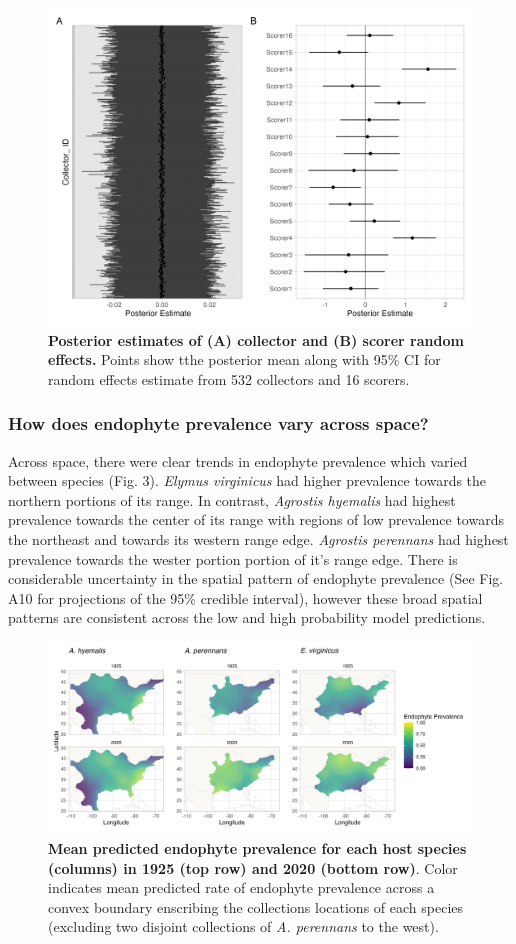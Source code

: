 \documentclass[11pt]{article}
\begin{document}
\begin{figure}[H]
	\label{fig:random_fx}
	\centering
	\includegraphics[width = .8\linewidth]{random_fx_plot.png}
	\caption{\textbf{Posterior estimates of (A) collector and (B) scorer random effects.} Points show tthe posterior mean along with 95\% CI for random effects estimate from 532 collectors and 16 scorers.}
\end{figure}


\subsubsection*{How does endophyte prevalence vary across space?}
Across space, there were clear trends in endophyte prevalence which varied between species (Fig. 3).
\emph{Elymus virginicus} had higher prevalence towards the northern portions of its range. 
In contrast, \emph{Agrostis hyemalis} had highest prevalence towards the center of its range with regions of low prevalence towards the northeast and towards its western range edge.
\emph{Agrostis perennans} had  highest prevalence towards the wester portion portion of it's range edge.
There is considerable uncertainty in the spatial pattern of endophyte prevalence (See Fig. A10 for projections of the 95\% credible interval), however these broad spatial patterns are consistent across the low and high probability model predictions. 

\begin{figure}[H]
	\label{fig:prevalence_map}
	\centering
	\includegraphics[width = \linewidth]{prevalence_map.png}
	\caption{\textbf{Mean predicted endophyte prevalence for each host species (columns) in 1925 (top row) and 2020 (bottom row)}. Color indicates mean predicted rate of endophyte prevalence across a convex boundary enscribing the collections locations of each species (excluding two disjoint collections of \emph{A. perennans} to the west).}
\end{figure}
\end{document}

